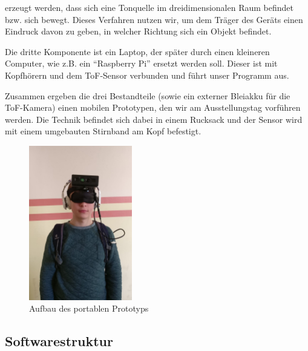 \documentclass[a4paper,12pt,ngerman]{scrartcl}
\begin{document}
erzeugt werden, dass sich eine Tonquelle im dreidimensionalen
Raum befindet bzw. sich bewegt. Dieses Verfahren nutzen wir, um dem Träger des Geräts einen Eindruck
davon zu geben, in welcher Richtung sich ein Objekt befindet.\par 
Die dritte Komponente ist ein Laptop, der später durch einen kleineren Computer, wie z.B. ein \enquote{Raspberry Pi}
ersetzt werden soll. Dieser ist mit Kopfhörern und dem ToF-Sensor verbunden und führt unser Programm aus.\par 
Zusammen ergeben die drei Bestandteile (sowie ein externer Bleiakku für die ToF-Kamera) einen mobilen Prototypen, den wir am Ausstellungstag vorführen werden. Die Technik befindet sich dabei in einem Rucksack und der Sensor wird mit einem
umgebauten Stirnband am Kopf befestigt.
\begin{figure}[H]
	\centering
	\includegraphics[width=0.4\textwidth]{device}
	\caption{Aufbau des portablen Prototyps}
	\label{dosuas_device}
\end{figure} 

\subsection{Softwarestruktur}
\end{document}

